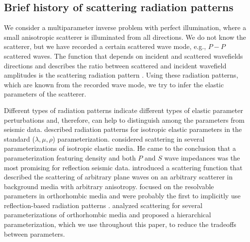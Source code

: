 \subsection{Brief history of scattering radiation patterns}

We consider a multiparameter inverse problem with perfect illumination, where a small anisotropic scatterer is illuminated from all directions. We do not know the scatterer, but we have recorded a certain scattered wave mode, e.g., $P-P$ scattered waves.
% 
The function that depends on incident and scattered wavefields directions and describes the ratio between scattered and incident wavefield amplitudes is the scattering radiation pattern \citep{wu1985,alkhalifah2014}. 
Using these radiation patterns, which are known from the recorded wave mode, we try to infer the elastic parameters of the scatterer.
%



%
%
%


Different types of radiation patterns indicate different types of elastic 
parameter perturbations and, therefore, can help to distinguish among the parameters from seismic data. \cite{wu1985} described radiation patterns for isotropic elastic 
parameters in the standard ($\lambda,\mu,\rho$) parameterization. 
%
\cite{tarantola1986} considered scattering in several parameterizations of 
isotropic elastic media. He came to the conclusion that a parameterization featuring density and both $P$ and $S$ wave impedances was the 
most promising for reflection seismic 
data. 
%
\cite{eaton1994} introduced a scattering function that 
described the scattering of arbitrary plane waves on an arbitrary scatterer in background media with arbitrary anisotropy. 
\cite{hoop1999} focused on the resolvable 
parameters in orthorhombic media and were probably the first to implicitly use 
reflection-based radiation patterns 
\citep{gholami20131,alkhalifah2014,kamath2016,plessix2016}. \cite{juwon2016} 
analyzed 
scattering for several parameterizations of orthorhombic media and proposed a 
hierarchical parameterization, which we use throughout this paper, to reduce the tradeoffs between parameters.